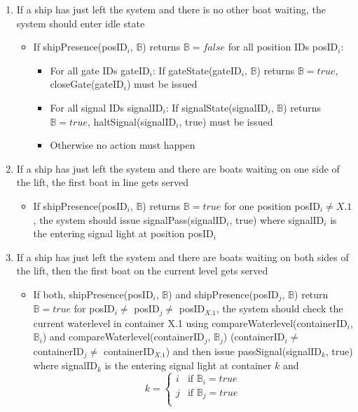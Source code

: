 \begin{enumerate}
	\item If a ship has just left the system and there is no other boat waiting, the system should enter idle state
			\begin{itemize}
				\item If shipPresence(posID$_i$, $\mathbb{B}$) returns $\mathbb{B} = false$ for all position IDs posID$_i$:
				\begin{itemize}
					\item For all gate IDs gateID$_i$: If gateState(gateID$_i$, $\mathbb{B}$) returns $\mathbb{B} = true$, closeGate(gateID$_i$) must be issued
					\item For all signal IDs signalID$_i$: If signalState(signalID$_i$, $\mathbb{B}$) returns $\mathbb{B} = true$, haltSignal(signalID$_i$, true) must be issued
					\item Otherwise no action must happen
				\end{itemize}
			\end{itemize}
		\item If a ship has just left the system and there are boats waiting on one side of the lift, the first boat in line gets served 
			\begin{itemize}
				\item If shipPresence(posID$_i$, $\mathbb{B}$) returns $\mathbb{B} = true$ for one position posID$_i \neq X.1$, the system should issue signalPass(signalID$_i$, true) where signalID$_i$ is the entering signal light at position posID$_i$
			\end{itemize}
		\item If a ship has just left the system and there are boats waiting on both sides of the lift, then the first boat on the current level gets served
			\begin{itemize}
				\item If both, shipPresence(posID$_i$, $\mathbb{B}$) and shipPresence(posID$_j$, $\mathbb{B}$) return $\mathbb{B} = true$ for posID$_i \neq$ posID$_j \neq$ posID$_{X.1}$, the system should check the current waterlevel in container X.1 using compareWaterlevel(containerID$_i$, $\mathbb{B}_i$) and compareWaterlevel(containerID$_j$, $\mathbb{B}_j$) (containerID$_i \neq$ containerID$_j \neq$ containerID$_{X.1}$) and then issue passSignal(signalID$_k$, true) where signalID$_k$ is the entering signal light at container $k$ and
				\begin{equation*}
					k = 
					\begin{cases}
						i & \text{if } \mathbb{B}_i = true\\
						j & \text{if } \mathbb{B}_j = true\\
					\end{cases}
				\end{equation*}
			\end{itemize}
	

\end{enumerate}
